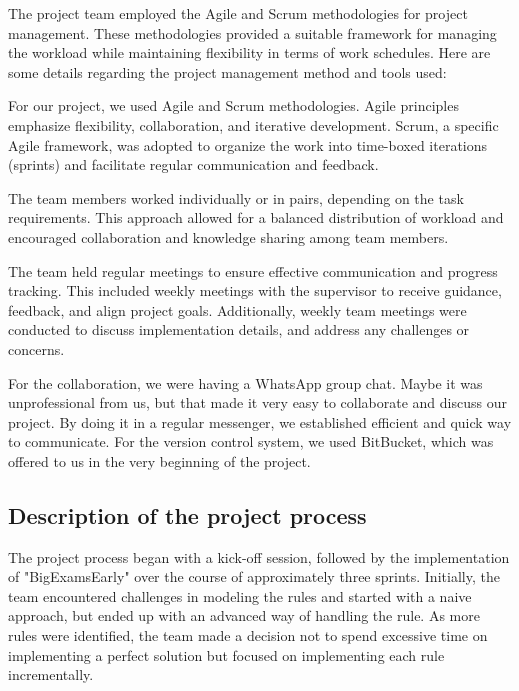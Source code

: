 The project team employed the Agile and Scrum methodologies for project management. These methodologies provided a suitable framework for managing the workload while maintaining flexibility in terms of work schedules. Here are some details regarding the project management method and tools used:

\vspace{\baselineskip}

For our project, we used Agile and Scrum methodologies. Agile principles emphasize flexibility, collaboration, and iterative development. Scrum, a specific Agile framework, was adopted to organize the work into time-boxed iterations (sprints) and facilitate regular communication and feedback.

\vspace{\baselineskip}

The team members worked individually or in pairs, depending on the task requirements. This approach allowed for a balanced distribution of workload and encouraged collaboration and knowledge sharing among team members.


\vspace{\baselineskip}

The team held regular meetings to ensure effective communication and progress tracking. This included weekly meetings with the supervisor to receive guidance, feedback, and align project goals. Additionally, weekly team meetings were conducted to discuss implementation details, and address any challenges or concerns.

\vspace{\baselineskip}

For the collaboration, we were having a WhatsApp group chat. Maybe it was unprofessional from us, but that made it very easy to collaborate and discuss our project. By doing it in a regular messenger, we established efficient and quick way to communicate. For the version control system, we used BitBucket, which was offered to us in the very beginning of the project.

\subsection{Description of the project process}

The project process began with a kick-off session, followed by the implementation of "BigExamsEarly" over the course of approximately three sprints. Initially, the team encountered challenges in modeling the rules and started with a naive approach, but ended up with an advanced way of handling the rule. As more rules were identified, the team made a decision not to spend excessive time on implementing a perfect solution but focused on implementing each rule incrementally.


